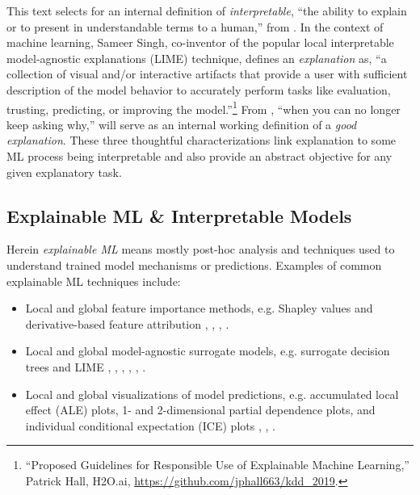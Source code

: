 \documentclass[sigconf]{acmart}
\begin{document}
This text selects for an internal definition of \textit{interpretable}, ``the ability to explain or to present in understandable terms to a human,'' from \citet{been_kim1}. In the context of machine learning, Sameer Singh, co-inventor of the popular local interpretable model-agnostic explanations (LIME) technique, defines an \textit{explanation} as, ``a collection of visual and/or interactive artifacts that provide a user with sufficient description of the model behavior to accurately perform tasks like evaluation, trusting, predicting, or improving the model.''\footnote{``Proposed Guidelines for Responsible Use of Explainable Machine Learning,'' Patrick Hall, H2O.ai, \url{https://github.com/jphall663/kdd_2019}.} From \citet{gilpin2018explaining}, ``when you can no longer keep asking why,'' will serve as an internal working definition of a \textit{good explanation}. These three thoughtful characterizations link explanation to some ML process being interpretable and also provide an abstract objective for any given explanatory task. 

\subsection{Explainable ML \& Interpretable Models }

Herein \textit{explainable ML} means mostly post-hoc analysis and techniques used to understand trained model mechanisms or predictions. Examples of common explainable ML techniques include:

\begin{itemize}
\item Local and global feature importance methods, e.g. Shapley values and derivative-based feature attribution \cite{grad_attr} \cite{keinan2004fair}, \cite{shapley}, \cite{shapley1988shapley}, \cite{kononenko2010efficient}.
\item Local and global model-agnostic surrogate models, e.g. surrogate decision trees and LIME \cite{dt_surrogate2}, \cite{viper}, \cite{dt_surrogate1}, \cite{lime-sup}, \cite{lime}, \cite{wf_xnn}. 
\item Local and global visualizations of model predictions, e.g. accumulated local effect (ALE) plots, 1- and 2-dimensional partial dependence plots, and individual conditional expectation (ICE) plots \cite{ale_plot}, \cite{esl}, \cite{ice_plots}.
\end{itemize}  
\end{document}
